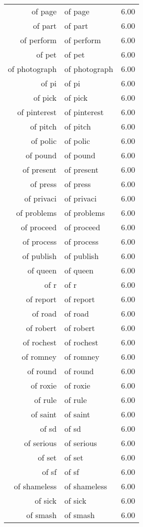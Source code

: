 \begin{table}[ht]
\begin{tabular}{rlr}
  of page & of page & 6.00 \\ 
  of part & of part & 6.00 \\ 
  of perform & of perform & 6.00 \\ 
  of pet & of pet & 6.00 \\ 
  of photograph & of photograph & 6.00 \\ 
  of pi & of pi & 6.00 \\ 
  of pick & of pick & 6.00 \\ 
  of pinterest & of pinterest & 6.00 \\ 
  of pitch & of pitch & 6.00 \\ 
  of polic & of polic & 6.00 \\ 
  of pound & of pound & 6.00 \\ 
  of present & of present & 6.00 \\ 
  of press & of press & 6.00 \\ 
  of privaci & of privaci & 6.00 \\ 
  of problems & of problems & 6.00 \\ 
  of proceed & of proceed & 6.00 \\ 
  of process & of process & 6.00 \\ 
  of publish & of publish & 6.00 \\ 
  of queen & of queen & 6.00 \\ 
  of r & of r & 6.00 \\ 
  of report & of report & 6.00 \\ 
  of road & of road & 6.00 \\ 
  of robert & of robert & 6.00 \\ 
  of rochest & of rochest & 6.00 \\ 
  of romney & of romney & 6.00 \\ 
  of round & of round & 6.00 \\ 
  of roxie & of roxie & 6.00 \\ 
  of rule & of rule & 6.00 \\ 
  of saint & of saint & 6.00 \\ 
  of sd & of sd & 6.00 \\ 
  of serious & of serious & 6.00 \\ 
  of set & of set & 6.00 \\ 
  of sf & of sf & 6.00 \\ 
  of shameless & of shameless & 6.00 \\ 
  of sick & of sick & 6.00 \\ 
  of smash & of smash & 6.00 \\ 

\end{tabular}
\end{table}
